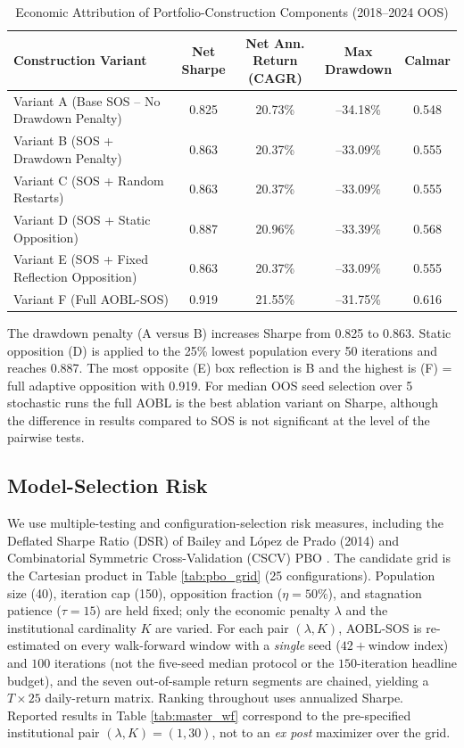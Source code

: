 \documentclass[11pt,a4paper]{article}
\begin{document}
\begin{table}[htbp]
\centering
\caption{Economic Attribution of Portfolio-Construction Components (2018--2024 OOS)}
\label{tab:ablation}
\hspace*{-1cm}
\begin{tabular}{lcccc}
\toprule
\textbf{Construction Variant} &
\makecell{\textbf{Net}\\\textbf{Sharpe}} &
\makecell{\textbf{Net Ann.}\\\textbf{Return (CAGR)}} &
\makecell{\textbf{Max}\\\textbf{Drawdown}} &
\textbf{Calmar} \\
\midrule
Variant A (Base SOS -- No Drawdown Penalty) & 0.825 & 20.73\% & --34.18\% & 0.548 \\
Variant B (SOS + Drawdown Penalty) & 0.863 & 20.37\% & --33.09\% & 0.555 \\
Variant C (SOS + Random Restarts) & 0.863 & 20.37\% & --33.09\% & 0.555 \\
Variant D (SOS + Static Opposition) & 0.887 & 20.96\% & --33.39\% & 0.568 \\
Variant E (SOS + Fixed Reflection Opposition) & 0.863 & 20.37\% & --33.09\% & 0.555 \\
Variant F (Full AOBL-SOS) & 0.919 & 21.55\% & --31.75\% & 0.616 \\
\bottomrule
\end{tabular}
\end{table}

The drawdown penalty (A versus B) increases Sharpe from 0.825 to 0.863. Static opposition (D) is applied to the 25\% lowest population every 50 iterations and reaches 0.887. The most opposite (E) box reflection is B and the highest is (F) = full adaptive opposition with 0.919. For median OOS seed selection over 5 stochastic runs the full AOBL is the best ablation variant on Sharpe, although the difference in results compared to SOS is not significant at the level of the pairwise tests.

\subsection{Model-Selection Risk}
\label{sec:pbo}
We use multiple-testing and configuration-selection risk measures, including the Deflated Sharpe Ratio (DSR) of Bailey and L\'opez de Prado (2014) and Combinatorial Symmetric Cross-Validation (CSCV) PBO \cite{bailey2017}. The candidate grid is the Cartesian product in Table \ref{tab:pbo_grid} (25 configurations). Population size (40), iteration cap (150), opposition fraction ($\eta=50\%$), and stagnation patience ($\tau=15$) are held fixed; only the economic penalty $\lambda$ and the institutional cardinality $K$ are varied. For each pair $(\lambda, K)$, AOBL-SOS is re-estimated on every walk-forward window with a \emph{single} seed ($42+$window index) and $100$ iterations (not the five-seed median protocol or the $150$-iteration headline budget), and the seven out-of-sample return segments are chained, yielding a $T \times 25$ daily-return matrix. Ranking throughout uses annualized Sharpe. Reported results in Table \ref{tab:master_wf} correspond to the pre-specified institutional pair $(\lambda, K) = (1, 30)$, not to an \emph{ex post} maximizer over the grid.
\end{document}
